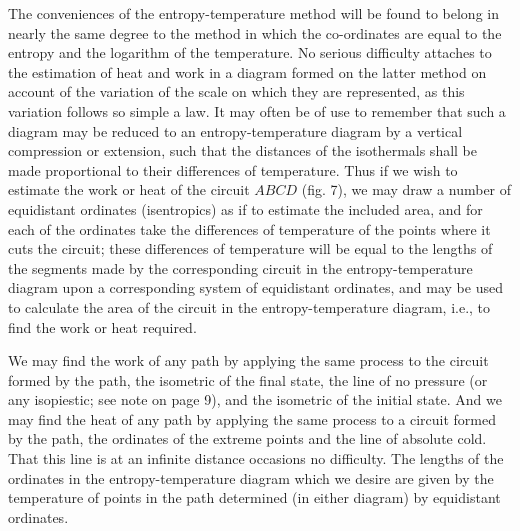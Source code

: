 \documentclass[11pt]{article}
\newcommand{\figlabel}[1]{\par\smallskip\centerline{\small #1}\smallskip}
\begin{document}
The conveniences of the entropy-temperature method will be found to belong in nearly the same degree to the method in which the co-ordinates are equal to the entropy and the logarithm of the temperature. No serious difficulty attaches to the estimation of heat and work in a diagram formed on the latter method on account of the variation of the scale on which they are represented, as this variation follows so simple a law. It may often be of use to remember that such a diagram may be reduced to an entropy-temperature diagram by a vertical compression or extension, such that the distances of the isothermals shall be made proportional to their differences of temperature. Thus if we wish to estimate the work or heat of the circuit $ABCD$ (fig. 7), we may draw a number of equidistant ordinates (isentropics) as if to estimate the included area, and for each of the ordinates take the differences of temperature of the points where it cuts the circuit; these differences of temperature will be equal to the lengths of the segments made by the corresponding circuit in the entropy-temperature diagram upon a corresponding system of equidistant ordinates, and may be used to calculate the area of the circuit in the entropy-temperature diagram, i.e., to find the work or heat required.


\begin{center}
\end{center}


We may find the work of any path by applying the same process to the circuit formed by the path, the isometric of the final state, the line of no pressure (or any isopiestic; see note on page 9), and the isometric of the initial state. And we may find the heat of any path by applying the same process to a circuit formed by the path, the ordinates of the extreme points and the line of absolute cold. That this line is at an infinite distance occasions no difficulty. The lengths of the ordinates in the entropy-temperature diagram which we desire are given by the temperature of points in the path determined (in either diagram) by equidistant ordinates.
\end{document}
